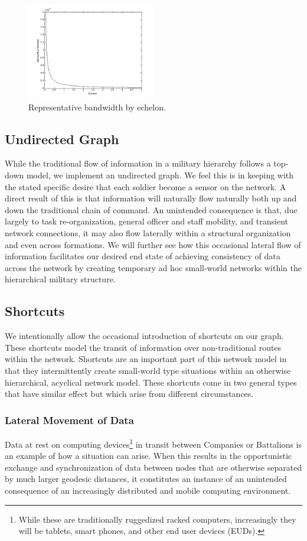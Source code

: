 \documentclass[10pt]{./IEEEtran}
\begin{document}
\begin{figure}[h!]
  \centering
    \includegraphics[width=0.5\textwidth]{images/bandwidth}
  \caption{Representative bandwidth by echelon.}
\end{figure}

\subsection{Undirected Graph}
While the traditional flow of information in a military hierarchy follows a top-down model, we implement an undirected graph.  We feel this is in keeping with the stated specific desire that each soldier become a sensor on the network\cite{Patton:2003}.  A direct result of this is that information will naturally flow naturally both up and down the traditional chain of command.  An unintended consequence is that, due largely to task re-organization, general officer and staff mobility, and transient network connections, it may also flow laterally within a structural organization and even across formations.  We will further see how this occasional lateral flow of information facilitates our desired end state of achieving consistency of data across the network by creating temporary ad hoc small-world networks within the hierarchical military structure.

\subsection{Shortcuts}
We intentionally allow the occasional introduction of shortcuts on our graph.  These shortcuts model the transit of information over non-traditional routes within the network.  Shortcuts are an important part of this network model in that they intermittently create small-world type situations within an otherwise hierarchical, acyclical network model.  These shortcuts come in two general types that have similar effect but which arise from different circumstances.

\subsubsection{Lateral Movement of Data} 
Data at rest on computing devices\footnote{While these are traditionally ruggedized racked computers, increasingly they will be tablets, smart phones, and other end user devices (EUDs).} in transit between Companies or Battalions is an example of how a situation can arise.  When this results in the opportunistic exchange and synchronization of data between nodes that are otherwise separated by much larger geodesic distances,  it constitutes an instance of an unintended consequence of an increasingly distributed and mobile computing environment.
\end{document}
